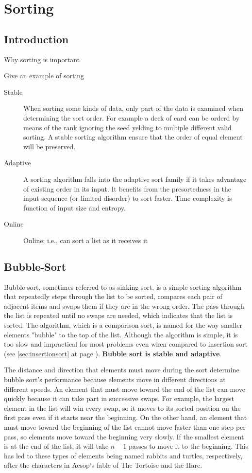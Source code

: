 \chapter{Sorting}

\section{Introduction}
Why sorting is important

Give an example of sorting
\begin{description}
\item[Stable] When sorting some kinds of data, only part of the data is examined when determining the sort order. For example a deck of card can be orderd by means of the rank ignoring the seed yelding to multiple different valid sorting. A stable sorting algorithm ensure that the order of equal element will be preserved. 
\item[Adaptive]	A sorting algorithm falls into the adaptive sort family if it takes advantage of existing order in its input.  It benefits from the presortedness in the input sequence (or limited disorder) to sort faster. Time complexity is function of input size and entropy.
\item [Online] Online; i.e., can sort a list as it receives it
\end{description}

\section{Bubble-Sort}
Bubble sort, sometimes referred to as sinking sort, is a simple sorting algorithm that repeatedly steps through the list to be sorted, compares each pair of adjacent items and swaps them if they are in the wrong order. The pass through the list is repeated until no swaps are needed, which indicates that the list is sorted. The algorithm, which is a comparison sort, is named for the way smaller elements "bubble" to the top of the list. Although the algorithm is simple, it is too slow and impractical for most problems even when compared to insertion sort (see \ref{sec:insertionsort} at page \pageref{sec:insertionsort}). \textbf{Bubble sort is stable and adaptive}.

The distance and direction that elements must move during the sort determine bubble sort's performance because elements move in different directions at different speeds. An element that must move toward the end of the list can move quickly because it can take part in successive swaps. For example, the largest element in the list will win every swap, so it moves to its sorted position on the first pass even if it starts near the beginning. On the other hand, an element that must move toward the beginning of the list cannot move faster than one step per pass, so elements move toward the beginning very slowly. If the smallest element is at the end of the list, it will take $n-1$ passes to move it to the beginning. This has led to these types of elements being named rabbits and turtles, respectively, after the characters in Aesop's fable of The Tortoise and the Hare.

